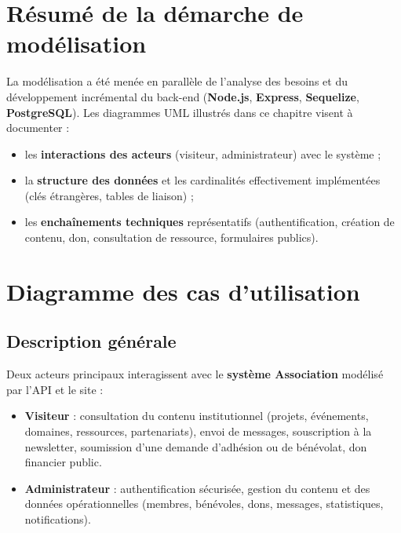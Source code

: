 \documentclass[12pt,a4paper,twoside,openright]{report}
\begin{document}
\section{Résumé de la démarche de modélisation}

La modélisation a été menée en parallèle de l'{}analyse des besoins et du développement incrémental du back-end (\textbf{Node.js}, \textbf{Express}, \textbf{Sequelize}, \textbf{PostgreSQL}). Les diagrammes UML illustrés dans ce chapitre visent à documenter :

\begin{itemize}[label=\textcolor{primaryBlue}{$\bullet$}, leftmargin=1.5cm, itemsep=0.3cm]
    \item les \textbf{interactions des acteurs} (visiteur, administrateur) avec le système ;
    \item la \textbf{structure des données} et les cardinalités effectivement implémentées (clés étrangères, tables de liaison) ;
    \item les \textbf{enchaînements techniques} représentatifs (authentification, création de contenu, don, consultation de ressource, formulaires publics).
\end{itemize}

\vspace{0.4cm}

\section{Diagramme des cas d'{}utilisation}

\subsection{Description générale}

Deux acteurs principaux interagissent avec le \textbf{système Association} modélisé par l'{}API et le site :

\begin{itemize}[label=\textcolor{primaryBlue}{$\triangleright$}, leftmargin=1.5cm, itemsep=0.25cm]
    \item \textbf{Visiteur} : consultation du contenu institutionnel (projets, événements, domaines, ressources, partenariats), envoi de messages, souscription à la newsletter, soumission d'{}une demande d'{}adhésion ou de bénévolat, don financier public.
    \item \textbf{Administrateur} : authentification sécurisée, gestion du contenu et des données opérationnelles (membres, bénévoles, dons, messages, statistiques, notifications).
\end{itemize}
\end{document}
